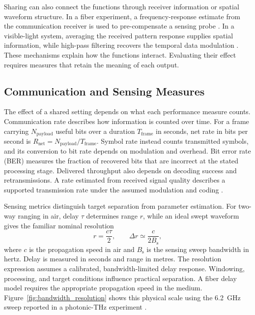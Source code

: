 Sharing can also connect the functions through receiver information or
spatial waveform structure. In a fiber experiment, a frequency-response
estimate from the communication receiver is used to pre-compensate a sensing
probe \cite{OISAC_SCR00057}. In a visible-light system, averaging the received
pattern response supplies spatial information, while high-pass filtering
recovers the temporal data modulation \cite{OISAC_SCR00196}.
These mechanisms explain how the functions interact. Evaluating their
effect requires measures that retain the meaning of each output.

\subsection{Communication and Sensing Measures}
\label{sec:communication_sensing_measures}

The effect of a shared setting depends on what each performance measure
counts. Communication rate describes how information is counted over time.
For a frame carrying $N_{\mathrm{payload}}$ useful bits over a duration
$T_{\mathrm{frame}}$ in seconds, net rate in bits per second is
$R_{\mathrm{net}}=N_{\mathrm{payload}}/T_{\mathrm{frame}}$.
Symbol rate instead counts transmitted symbols, and its conversion to bit
rate depends on modulation and overhead. Bit error rate (BER) measures the
fraction of recovered bits that are incorrect at the stated processing stage.
Delivered throughput also depends on decoding success and retransmissions.
A rate estimated from received signal quality describes a supported
transmission rate under the assumed modulation and coding
\cite{OISAC_SCR01054,OISAC_SCR01180,OISAC_SCR00196}.

Sensing metrics distinguish target separation from parameter estimation.
For two-way ranging in air, delay $\tau$ determines range $r$, while an
ideal swept waveform gives the familiar nominal resolution
\begin{equation}
r=\frac{c\tau}{2},
\qquad
\Delta r \simeq \frac{c}{2B_{\mathrm{s}}},
\label{eq:range_and_resolution}
\end{equation}
where $c$ is the propagation speed in air and $B_{\mathrm{s}}$ is the sensing
sweep bandwidth in hertz. Delay is measured in seconds and range in metres.
The resolution expression assumes a calibrated, bandwidth-limited delay
response. Windowing, processing, and target conditions influence practical
separation. A fiber delay model requires the appropriate propagation speed
in the medium.
Figure~\ref{fig:bandwidth_resolution} shows this physical scale using the
6.2~GHz sweep reported in a photonic-THz experiment
\cite{OISAC_SCR00083}.

